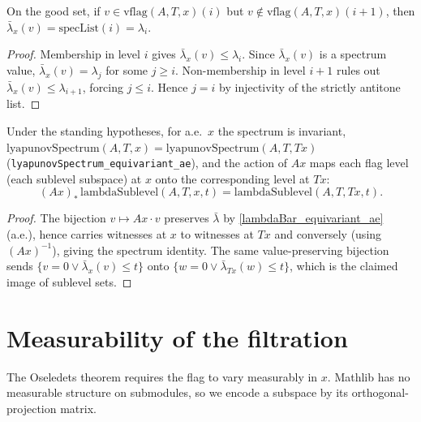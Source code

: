\begin{lemma}\label{lambdaBar_eq_on_stratum}
  \leanok
  On the good set, if $v\in\mathrm{vflag}(A,T,x)(i)$ but
  $v\notin\mathrm{vflag}(A,T,x)(i{+}1)$, then $\bar\lambda_x(v)=\mathrm{specList}(i)=\lambda_i$.
  \begin{proof}\leanok
  Membership in level $i$ gives $\bar\lambda_x(v)\le\lambda_i$. Since
  $\bar\lambda_x(v)$ is a spectrum value, $\bar\lambda_x(v)=\lambda_j$ for some
  $j\ge i$. Non-membership in level $i{+}1$ rules out $\bar\lambda_x(v)\le
  \lambda_{i+1}$, forcing $j\le i$. Hence $j=i$ by injectivity of the strictly
  antitone list.
  \end{proof}
\end{lemma}

\begin{theorem}\label{vflag_equivariant}
  \leanok
  Under the standing hypotheses, for a.e.\ $x$ the spectrum is invariant,
  $\mathrm{lyapunovSpectrum}(A,T,x)=\mathrm{lyapunovSpectrum}(A,T,Tx)$
  (\texttt{lyapunovSpectrum\_equivariant\_ae}), and the action of $A x$ maps each
  flag level (each sublevel subspace) at $x$ onto the corresponding level at $Tx$:
  \[ (A x)_*\,\mathrm{lambdaSublevel}(A,T,x,t)
     = \mathrm{lambdaSublevel}(A,T,Tx,t). \]
  \begin{proof}\leanok
  The bijection $v\mapsto A x\cdot v$ preserves $\bar\lambda$ by
  \ref{lambdaBar_equivariant_ae} (a.e.), hence carries witnesses at $x$ to
  witnesses at $Tx$ and conversely (using $(A x)^{-1}$), giving the spectrum
  identity. The same value-preserving bijection sends $\{v=0\lor\bar\lambda_x(v)\le t\}$
  onto $\{w=0\lor\bar\lambda_{Tx}(w)\le t\}$, which is the claimed image of
  sublevel sets.
  \end{proof}
\end{theorem}

\section{Measurability of the filtration}

The Oseledets theorem requires the flag to vary measurably in $x$. Mathlib has
no measurable structure on submodules, so we encode a subspace by its
orthogonal-projection matrix.

